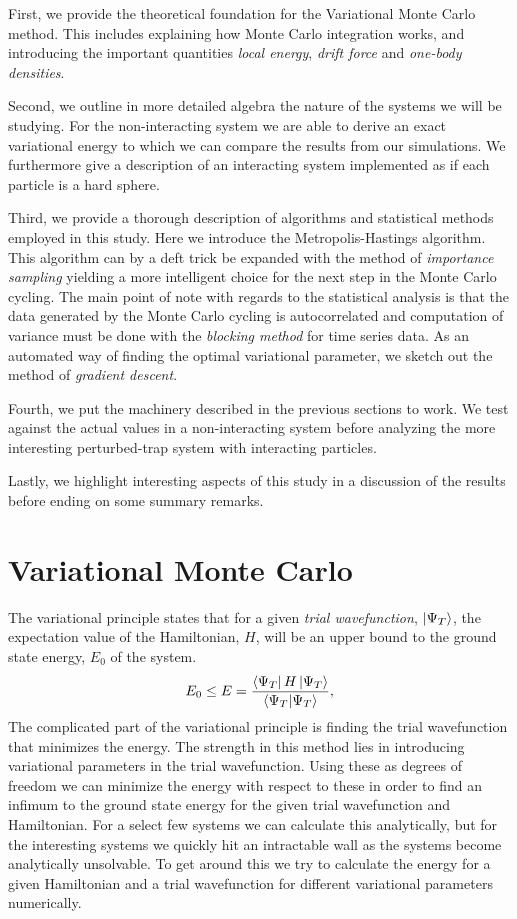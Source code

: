 \documentclass[
    a4paper, aps, twocolumn, floatfix, superscriptaddress,
    nofootinbib]{revtex4-1}
\newcommand{\1}{\mathds{1}}
\begin{document}
	First, we provide the theoretical foundation for the Variational Monte Carlo
	method. This includes explaining how Monte Carlo integration works, and
	introducing the important quantities \emph{local energy}, \emph{drift force}
	and \emph{one-body densities}.  
   	
    Second, we outline in more detailed algebra the nature of the systems we
    will be studying. For the non-interacting system we are able to derive an
    exact variational energy to which we can compare the results from our
    simulations. We furthermore give a description of an interacting system
    implemented as if each particle is a hard sphere. 
    
    Third, we provide a thorough description of algorithms and statistical
    methods employed in this study. Here we introduce the Metropolis-Hastings
    algorithm. This algorithm can by a deft trick be expanded with the method of
    \emph{importance sampling} yielding a more intelligent choice for the next
    step in the Monte Carlo cycling.  The main point of note with regards to the
    statistical analysis is that the data generated by the Monte Carlo cycling
    is autocorrelated and computation of variance must be done with the
    \emph{blocking method} for time series data.  As an automated way of finding
    the optimal variational parameter, we sketch out the method of
    \emph{gradient descent}.  
    
    Fourth, we put the machinery described in the previous sections to work. We
    test against the actual values in a non-interacting system before analyzing
    the more interesting perturbed-trap system with interacting particles.  
    
    Lastly, we highlight interesting aspects of this study in a discussion of
    the results before ending on some summary remarks.

\section{Variational Monte Carlo}
    The variational principle states that for a given \emph{trial wavefunction},
    $\ket{\Psi_T}$, the expectation value of the Hamiltonian, $H$, will be an
    upper bound to the ground state energy, $E_0$ of the system.
    \begin{align}
        E_0 \leq E
        = \frac{\bra{\Psi_T}H\ket{\Psi_T}}{\bra{\Psi_T}\ket{\Psi_T}},
    \end{align}
    The complicated part of the variational principle is finding the trial
    wavefunction that minimizes the energy. The strength in this method lies in
    introducing variational parameters in the trial wavefunction. Using these as
    degrees of freedom we can minimize the energy with respect to these in order
    to find an infimum to the ground state energy for the given trial
    wavefunction and Hamiltonian. For a select few systems we can calculate this
    analytically, but for the interesting systems we quickly hit an intractable
    wall as the systems become analytically unsolvable. To get around this we
    try to calculate the energy for a given Hamiltonian and a trial wavefunction
    for different variational parameters numerically.
\end{document}
